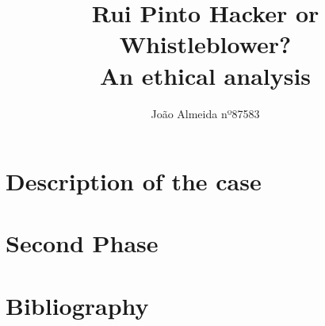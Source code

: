 \documentclass{article}
\title{Rui Pinto Hacker or Whistleblower? \\ An ethical analysis}
\author{João Almeida nº87583}
\begin{document}
\maketitle

\section{Description of the case}


\section{Second Phase}


\clearpage
\section{Bibliography}


\clearpage
\tableofcontents
\end{document}
